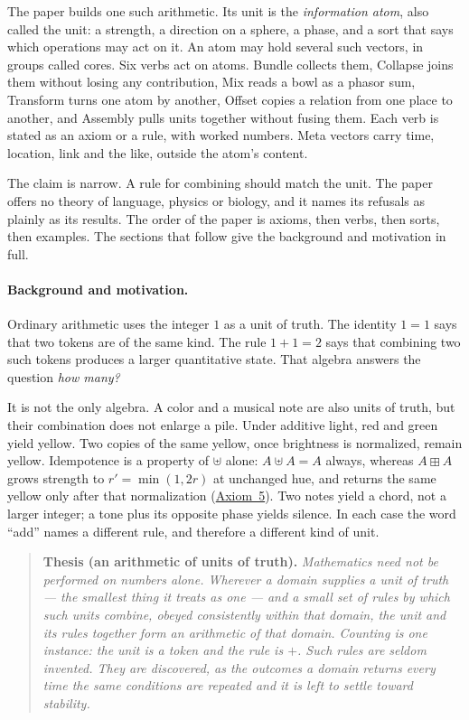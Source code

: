 \documentclass[12pt, a4paper]{article}
\begin{document}
The paper builds one such arithmetic. Its unit is the \emph{information atom}, also called the unit: a strength, a direction on a sphere, a phase, and a sort that says which operations may act on it. An atom may hold several such vectors, in groups called cores. Six verbs act on atoms. Bundle collects them, Collapse joins them without losing any contribution, Mix reads a bowl as a phasor sum, Transform turns one atom by another, Offset copies a relation from one place to another, and Assembly pulls units together without fusing them. Each verb is stated as an axiom or a rule, with worked numbers. Meta vectors carry time, location, link and the like, outside the atom's content.

The claim is narrow. A rule for combining should match the unit. The paper offers no theory of language, physics or biology, and it names its refusals as plainly as its results. The order of the paper is axioms, then verbs, then sorts, then examples. The sections that follow give the background and motivation in full.

\paragraph{Background and motivation.}
Ordinary arithmetic uses the integer $1$ as a unit of truth.
The identity $1=1$ says that two tokens are of the same kind.
The rule $1+1=2$ says that combining two such tokens produces a
larger quantitative state. That algebra answers the question
\emph{how many?}

It is not the only algebra. A color and a musical note are also
units of truth, but their combination does not enlarge a pile.
Under additive light, red and green yield yellow. Two copies of
the same yellow, once brightness is normalized, remain yellow.
Idempotence is a property of $\uplus$ alone: $A\uplus A=A$ always,
whereas $A\boxplus A$ grows strength to $r'=\min(1,2r)$ at unchanged
hue, and returns the same yellow only after that normalization
(\hyperref[subsec:axiom_interference]{Axiom~5}).
Two notes yield a chord, not a larger integer; a tone plus its
opposite phase yields silence. In each case the word ``add''
names a different rule, and therefore a different kind of unit.

\begin{quote}
\textbf{Thesis (an arithmetic of units of truth).}
\emph{Mathematics need not be performed on numbers alone. Wherever a
domain supplies a unit of truth --- the smallest thing it treats as
one --- and a small set of rules by which such units combine, obeyed
consistently within that domain, the unit and its rules together form
an arithmetic of that domain. Counting is one instance: the unit is a
token and the rule is $+$. Such rules are seldom invented. They are
discovered, as the outcomes a domain returns every time the same
conditions are repeated and it is left to settle toward stability.}
\end{quote}
\end{document}

